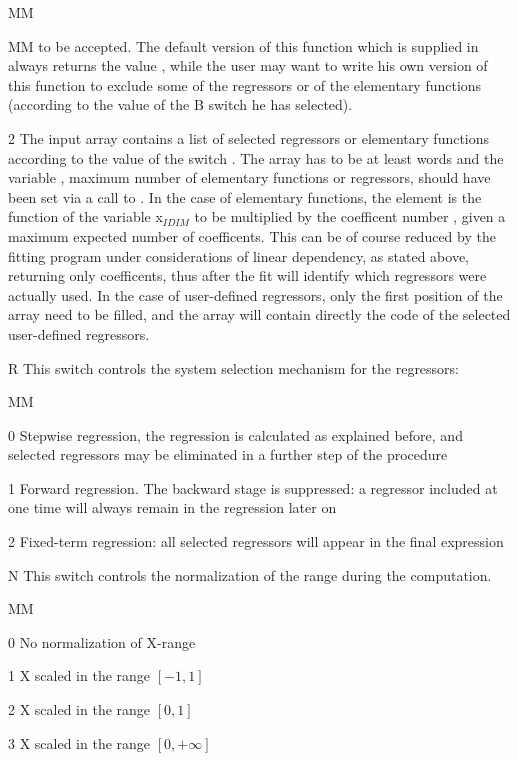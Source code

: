 \begin{DLtt}{MM}
\begin{DLtt}{MM}
to be accepted.
The default version of this function which is supplied in 
always returns the value , while the user may want to write
his own version of this function to exclude some of the regressors or of the
elementary functions (according to the value of the B switch he has selected).
\item[2] The input array  contains a list of
selected regressors
or elementary functions according to the value of the switch .
The array has to
be at least  words and the variable ,
maximum number of elementary functions or regressors, should have
been set via a call to .
In the case of elementary functions, the element
 is the function of the variable x$_{IDIM}$
to be multiplied by the coefficent number ,
given a maximum expected number of  coefficents.
This can be of course reduced by the fitting
program under considerations of linear dependency, as stated above,
returning only  coefficents, thus after the fit
 will identify which regressors were actually used.
In the case of user-defined
regressors, only the first  position of the 
array need to be filled, and the array will contain directly the code
of the selected user-defined regressors.
\end{DLtt}
\item[R] This switch controls the system selection mechanism
for the regressors:
\begin{DLtt}{MM}
\item[0] Stepwise regression, the regression is calculated as
explained before, and selected regressors may be eliminated in a further
step of the procedure
\item[1] Forward regression. The backward stage is suppressed: a regressor
included at one time will always remain in the regression later on
\item[2] Fixed-term regression: all selected regressors
will appear in the final expression
\end{DLtt}
\item[N] This switch controls the normalization of the 
range during the computation.
\begin{DLtt}{MM}
\item[0] No normalization of X-range
\item[1] X scaled in the range $[-1,1]$
\item[2] X scaled in the range $[0,1]$
\item[3] X scaled in the range $[0,+\infty]$
\end{DLtt}
\end{DLtt}
 
